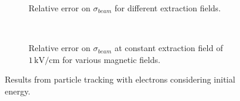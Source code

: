 \begin{figure}[!ht]
	\begin{subfigure}[t]{0.5\textwidth}
		
		\caption{Relative error on $\sigma_{beam}$ for different extraction fields.}
		\label{chap3:ElectronProfile_a}
	\end{subfigure}
	~
	\begin{subfigure}[t]{0.5\textwidth}
		
		\caption{Relative error on $\sigma_{beam}$ at constant extraction field of $1\,\mathrm{kV/cm}$ for various magnetic fields.}
		\label{chap3:ElectronProfile_b}
	\end{subfigure}
	\caption[Results from particle tracking with electrons considering initial energy]{Results from particle tracking with electrons considering initial energy.}
	\label{chap3:ElectronProfile}
\end{figure}